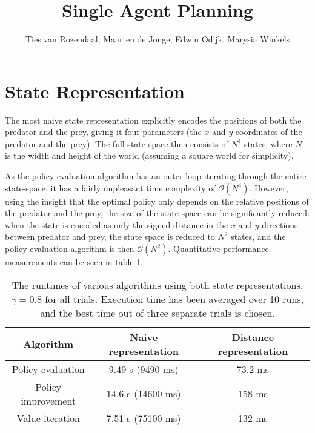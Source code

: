 \documentclass[a4paper, 12pt]{article}
\begin{document}
\title{Single Agent Planning}
\author{Ties van Rozendaal, Maarten de Jonge, Edwin Odijk, Marysia Winkels}
\maketitle

\section*{State Representation}
The most naive state representation explicitly encodes the positions of both the
predator and the prey, giving it four parameters (the $x$ and $y$ coordinates of
the predator and the prey). The full state-space then consists of $N^4$ states,
where $N$ is the width and height of the world (assuming a square world for
simplicity).

As the policy evaluation algorithm has an outer loop iterating through the
entire state-space, it has a fairly unpleasant time complexity of
$\mathcal{O}(N^4)$. However, using the insight that the optimal policy only
depends on the relative positions of the predator and the prey, the size of the
state-space can be significantly reduced: when the state is encoded as only the
signed distance in the $x$ and $y$ directions between predator and prey, the
state space is reduced to $N^2$ states, and the policy evaluation algorithm is
then $\mathcal{O}(N^2)$. Quantitative performance measurements can be seen in table
\ref{tbl:representation}.

\begin{table}
	\begin{tabular}{|c|c|c|}
		\hline
		Algorithm & Naive representation & Distance representation \\
		\hline
		Policy evaluation & 9.49 s (9490 ms) & 73.2 ms \\
		Policy improvement & 14.6 s (14600 ms) & 158 ms \\
		Value iteration & 7.51 s (75100 ms)& 132 ms \\
		\hline
	\end{tabular}
	\caption{The runtimes of various algorithms using both state representations.
		$\gamma = 0.8$ for all trials. Execution time has been averaged over 10
		runs, and the best time out of three separate trials is chosen.}
	\label{tbl:representation}
\end{table}
\end{document}
